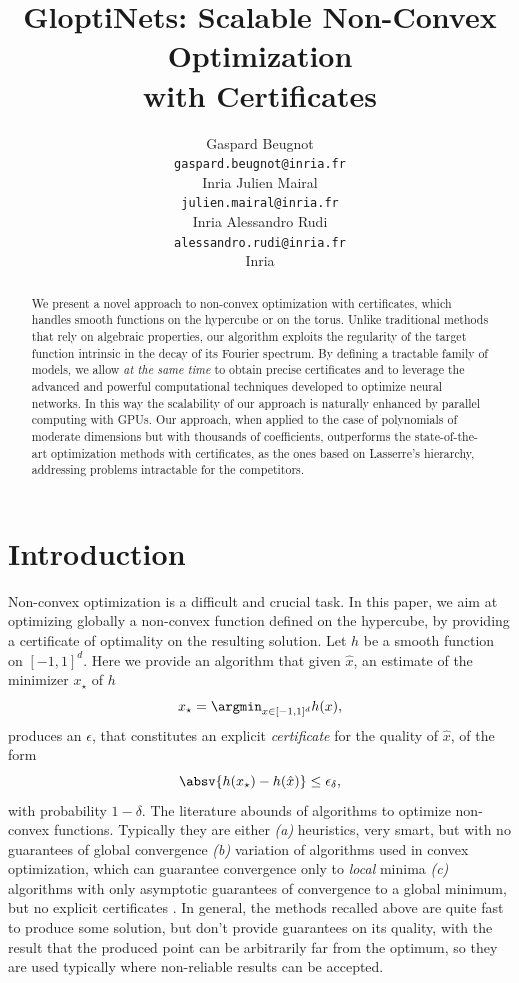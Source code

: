 \documentclass{article}
\title{GloptiNets: Scalable Non-Convex Optimization \\ with Certificates}
\author{%
 Gaspard Beugnot \\
 \texttt{gaspard.beugnot@inria.fr} \\
 Inria
 \AND
 Julien Mairal \\
 \texttt{julien.mairal@inria.fr} \\
 Inria
 \And
 Alessandro Rudi \\
 \texttt{alessandro.rudi@inria.fr} \\
 Inria
}
\begin{document}
\maketitle

\begin{abstract}

  We present a novel approach to non-convex optimization with certificates, which handles smooth functions on the hypercube or on the torus. Unlike traditional methods that rely on algebraic properties, our algorithm exploits the regularity of the target function intrinsic in the decay of its Fourier spectrum. By defining a tractable family of models, we allow \emph{at the same time} to obtain precise certificates and to leverage the advanced and powerful computational techniques developed to optimize neural networks. In this way the scalability of our approach is naturally enhanced by parallel computing with GPUs. Our approach, when applied to the case of polynomials of moderate dimensions but with thousands of coefficients, outperforms the state-of-the-art optimization methods with certificates, as the ones based on Lasserre's hierarchy, addressing problems intractable for the competitors.
\end{abstract}

\section{Introduction}

Non-convex optimization is a difficult and crucial task. In this paper, we aim at optimizing globally a non-convex function defined on the hypercube, by providing a certificate of optimality on the resulting solution. Let $h$ be a smooth function on $[-1,1]^d$. Here we provide an algorithm that given $\hat{x}$, an estimate of the minimizer $x_\star$ of $h$
\begin{equation*}
  x_\star = \argmin_{x \in [-1,1]^d} h(x),
\end{equation*}
produces an $\epsilon$, that constitutes an explicit \emph{certificate} for the quality of $\widehat{x}$, of the form
\begin{equation*}
  \absv{h(x_\star) - h(\hat{x})} \leq \epsilon_\delta,
\end{equation*}
with probability $1-\delta$.
The literature abounds of algorithms to optimize non-convex functions. Typically they are either \emph{(a)} heuristics, very smart, but with no guarantees of global convergence \cite{moscato1989evolution,horst2013handbook} \emph{(b)} variation of algorithms used in convex optimization, which can guarantee convergence only to \emph{local} minima \cite{boyd2004convex} \emph{(c)} algorithms with only asymptotic guarantees of convergence to a global minimum, but no explicit certificates \cite{van1987simulated}. In general, the methods recalled above are quite fast to produce some solution, but don't provide guarantees on its quality, with the result that the produced point can be arbitrarily far from the optimum, so they are used typically where non-reliable results can be accepted.
\end{document}
